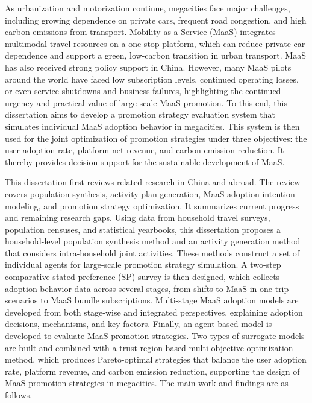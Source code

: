 \setlength{\baselineskip}{20pt}
\begin{englishabstract}

As urbanization and motorization continue, megacities face major challenges, including growing dependence on private cars, frequent road congestion, and high carbon emissions from transport. Mobility as a Service (MaaS) integrates multimodal travel resources on a one-stop platform, which can reduce private-car dependence and support a green, low-carbon transition in urban transport. MaaS has also received strong policy support in China. However, many MaaS pilots around the world have faced low subscription levels, continued operating losses, or even service shutdowns and business failures, highlighting the continued urgency and practical value of large-scale MaaS promotion. To this end, this dissertation aims to develop a promotion strategy evaluation system that simulates individual MaaS adoption behavior in megacities. This system is then used for the joint optimization of promotion strategies under three objectives: the user adoption rate, platform net revenue, and carbon emission reduction. It thereby provides decision support for the sustainable development of MaaS.

This dissertation first reviews related research in China and abroad. The review covers population synthesis, activity plan generation, MaaS adoption intention modeling, and promotion strategy optimization. It summarizes current progress and remaining research gaps. Using data from household travel surveys, population censuses, and statistical yearbooks, this dissertation proposes a household-level population synthesis method and an activity generation method that considers intra-household joint activities. These methods construct a set of individual agents for large-scale promotion strategy simulation. A two-step comparative stated preference (SP) survey is then designed, which collects adoption behavior data across several stages, from shifts to MaaS in one-trip scenarios to MaaS bundle subscriptions. Multi-stage MaaS adoption models are developed from both stage-wise and integrated perspectives, explaining adoption decisions, mechanisms, and key factors. Finally, an agent-based model is developed to evaluate MaaS promotion strategies. Two types of surrogate models are built and combined with a trust-region-based multi-objective optimization method, which produces Pareto-optimal strategies that balance the user adoption rate, platform revenue, and carbon emission reduction, supporting the design of MaaS promotion strategies in megacities. The main work and findings are as follows.


\end{englishabstract}
